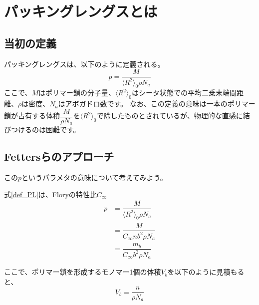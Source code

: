 \documentclass[a4paper,11pt]{jlreq}
\begin{document}
\section{パッキングレングスとは}

\subsection{当初の定義}

パッキングレングスは、以下のように定義される。
\begin{equation}
    p=\dfrac{M}{\langle R^2 \rangle_0 \rho N_a}
    \label{def_PL}
\end{equation}
ここで、$M$はポリマー鎖の分子量、$\langle R^2 \rangle_0$はシータ状態での平均二乗末端間距離、$\rho$は密度、$N_a$はアボガドロ数です。
なお、この定義の意味は一本のポリマー鎖が占有する体積$\dfrac{M}{\rho N_a}$を$\langle R^2 \rangle_0$で除したものとされているが、物理的な直感に結びつけるのは困難です。

\subsection{Fettersらのアプローチ}
この$p$というパラメタの意味について考えてみよう。

式\eqref{def_PL}は、Floryの特性比$C_{\infty}$
\begin{align}
    p&=\dfrac{M}{\langle R^2 \rangle_0 \rho N_a} \\
    &=\dfrac{M}{C_{\infty} n b^2 \rho N_a} \\
    &=\dfrac{m_b}{C_{\infty}b^2\rho N_a}
\end{align}

ここで、ポリマー鎖を形成するモノマー1個の体積$V_b$を以下のように見積もると、
\begin{equation}
    V_b=\dfrac{n}{\rho N_a}
\end{equation}


    \centering
        


\end{document}
